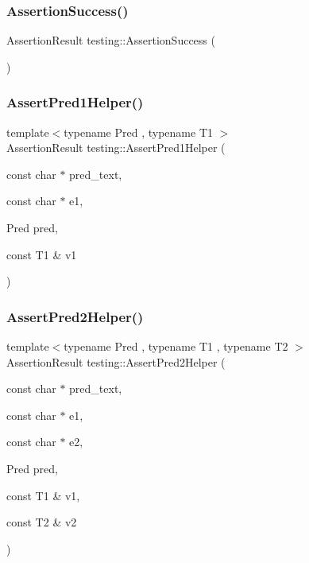 \mbox{\label{namespacetesting_ac1d0baedb17286c5c6c87bd1a45da8ac}} 
\subsubsection{\texorpdfstring{AssertionSuccess()}{AssertionSuccess()}}
{\footnotesize\ttfamily Assertion\+Result testing\+::\+Assertion\+Success (\begin{DoxyParamCaption}{ }\end{DoxyParamCaption})}

\mbox{\label{namespacetesting_a7f73180474723be6e92185d6fa9e7c9f}} 
\subsubsection{\texorpdfstring{AssertPred1Helper()}{AssertPred1Helper()}}
{\footnotesize\ttfamily template$<$typename Pred , typename T1 $>$ \\
Assertion\+Result testing\+::\+Assert\+Pred1\+Helper (\begin{DoxyParamCaption}\item[{const char $\ast$}]{pred\+\_\+text,  }\item[{const char $\ast$}]{e1,  }\item[{Pred}]{pred,  }\item[{const T1 \&}]{v1 }\end{DoxyParamCaption})}

\mbox{\label{namespacetesting_aa6587938029dd8733ecb885068f08247}} 
\subsubsection{\texorpdfstring{AssertPred2Helper()}{AssertPred2Helper()}}
{\footnotesize\ttfamily template$<$typename Pred , typename T1 , typename T2 $>$ \\
Assertion\+Result testing\+::\+Assert\+Pred2\+Helper (\begin{DoxyParamCaption}\item[{const char $\ast$}]{pred\+\_\+text,  }\item[{const char $\ast$}]{e1,  }\item[{const char $\ast$}]{e2,  }\item[{Pred}]{pred,  }\item[{const T1 \&}]{v1,  }\item[{const T2 \&}]{v2 }\end{DoxyParamCaption})}

